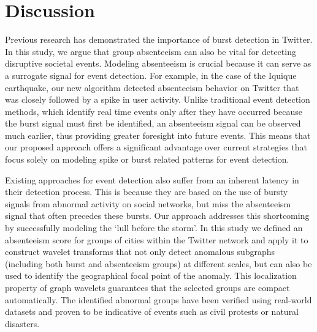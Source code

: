 \section{Discussion}
\label{sec:conclusion}
Previous research has demonstrated the importance of burst detection in Twitter. In this study, we argue that group absenteeism can also be vital for detecting disruptive societal events. Modeling absenteeism is crucial because it can serve as a surrogate signal for event detection. For example, in the case of the Iquique earthquake, our new algorithm detected absenteeism behavior on Twitter that was closely followed by a spike in user activity. Unlike traditional event detection methods, which identify real time events only after they have occurred because the burst signal must first be identified, an absenteeism signal can be observed much earlier, thus providing greater foresight into future events. This means that our proposed approach offers a significant advantage over current strategies that focus solely on modeling spike or burst related patterns for event detection.


Existing approaches for event detection also suffer from an inherent latency in their detection process. This is because they are based on the use of bursty signals from abnormal activity on social networks, but miss the absenteeism signal that often precedes these bursts. Our approach addresses this shortcoming by successfully modeling the `lull before the storm'. In this study we defined an absenteeism score for groups of cities within the Twitter network and apply it to construct wavelet transforms that not only
detect anomalous subgraphs (including both burst and absenteeism groups) at different scales, but can also be used to identify the geographical focal point of the anomaly. This localization property of graph wavelets guarantees that the selected groups are compact automatically. The identified abnormal groups have been verified using real-world datasets and proven to be indicative of
events such as civil protests or natural disasters.

